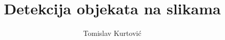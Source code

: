 \documentclass[times, utf8, zavrsni]{fer}
\begin{document}

\title{Detekcija objekata na slikama}

\author{Tomislav Kurtović}

\maketitle

\izvornik

\zahvala{}

\tableofcontents













\end{document}
